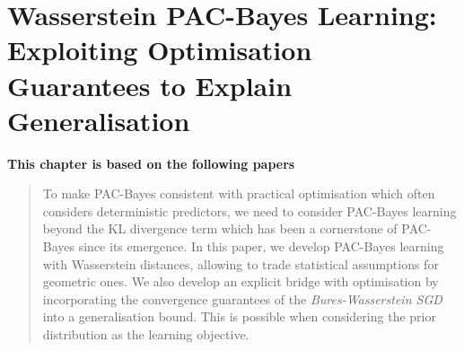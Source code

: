 \chapter[Wasserstein PAC-Bayes Learning: Exploiting Optimisation Guarantees to Explain Generalisation]{Wasserstein PAC-Bayes Learning: Exploiting Optimisation Guarantees to Explain Generalisation}
\label{chap: wass-pb}
\addchapterlof
\addchapterloa
\addchapterloe

\vspace{-1.6cm}
\begin{center}
\textbf{This chapter is based on the following papers}\\
\end{center}
\vspace{-0.3cm}

\vspace{-0.3cm}
\minitoc

\vspace{-0.2cm}

\begin{abstract}
    To make PAC-Bayes consistent with practical optimisation which often considers deterministic predictors, we need to consider PAC-Bayes learning beyond the KL divergence term which has been a cornerstone of PAC-Bayes since its emergence. In this paper, we develop PAC-Bayes learning with Wasserstein distances, allowing to trade statistical assumptions for geometric ones. We also develop an explicit bridge with optimisation by incorporating the convergence guarantees of the \emph{Bures-Wasserstein SGD} into a generalisation bound. This is possible when considering the prior distribution as the learning objective.    
\end{abstract}

\newpage

